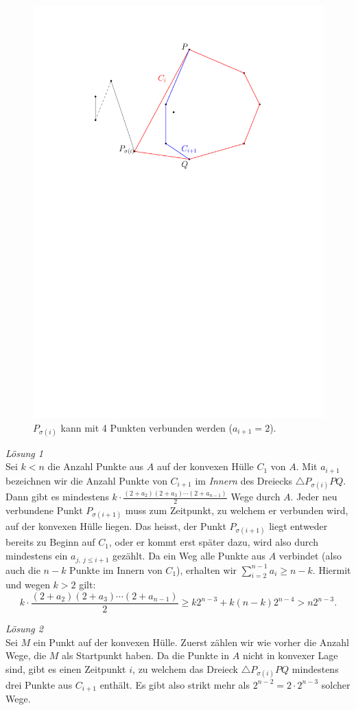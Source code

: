 \documentclass[12pt,a4paper]{article}
\theoremstyle{plain}
\theoremstyle{definition}
\theoremstyle{remark}
\begin{document}
\begin{enumerate}
		\begin{figure}[ht!]
			\centering
			\includegraphics[width=0.5\linewidth]{fig-loesung9.pdf}
			\caption{$P_{\sigma(i)}$ kann mit 4 Punkten verbunden werden ($a_{i+1}=2$).}
		\end{figure}		
		
		
		\textit{Lösung 1}\\
		Sei $k<n$ die Anzahl Punkte aus $A$ auf der konvexen Hülle $C_1$ von $A$. Mit $a_{i+1}$ bezeichnen wir die Anzahl Punkte von $C_{i+1}$ im \emph{Innern} des Dreiecks $\triangle P_{\sigma(i)}PQ$. Dann gibt es mindestens $k\cdot \frac{(2+a_2)(2+a_3)\cdots(2+a_{n-1})}{2}$ Wege durch $A$. Jeder neu verbundene Punkt $P_{\sigma(i+1)}$ muss zum Zeitpunkt, zu welchem er verbunden wird, auf der konvexen Hülle liegen. Das heisst, der Punkt $P_{\sigma(i+1)}$ liegt entweder bereits zu Beginn auf $C_1$, oder er kommt erst später dazu, wird also durch mindestens ein $a_{j,\ j\leq i+1}$ gezählt.  Da ein Weg alle Punkte aus $A$ verbindet (also auch die $n-k$ Punkte im Innern von $C_1$), erhalten wir $\sum_{i=2}^{n-1}a_i \geq n-k$. Hiermit und wegen $k>2$ gilt:
		\[	k\cdot \frac{(2+a_2)(2+a_3)\cdots(2+a_{n-1})}{2} \geq k2^{n-3}+k(n-k)2^{n-4}>n2^{n-3}.	\]

		\textit{Lösung 2}\\
		Sei $M$ ein Punkt auf der konvexen Hülle. Zuerst zählen wir wie vorher die Anzahl Wege, die $M$ als Startpunkt haben. Da die Punkte in $A$ nicht in konvexer Lage sind, gibt es einen Zeitpunkt $i$, zu welchem das Dreieck $\triangle P_{\sigma(i)}PQ$ mindestens drei Punkte aus $C_{i+1}$ enthält. Es gibt also strikt mehr als $2^{n-2} = 2\cdot 2^{n-3}$ solcher Wege.


\end{enumerate}
\end{document}

